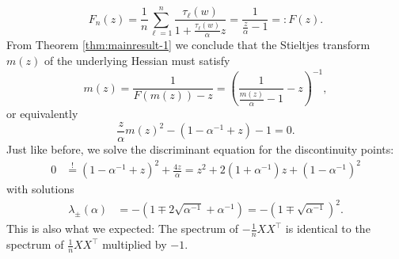 \documentclass{article}
\begin{document}
\begin{equation}
F_n(z)=\frac{1}{n}\sum_{\ell=1}^n\frac{\tau_\ell(w)}{1+\frac{\tau_\ell(w)}{\alpha}z}=\frac{1}{\frac{z}{\alpha}-1}=:F(z).
\end{equation}
From Theorem \ref{thm:mainresult-1} we conclude that the Stieltjes transform $m(z)$ of the underlying Hessian must satisfy
\begin{equation}
m(z)=\frac{1}{F(m(z))-z}=\left(\frac{1}{\frac{m(z)}{\alpha}-1}-z\right)^{-1},
\end{equation}
or equivalently
\begin{equation}
\frac{z}{\alpha}m(z)^2-(1-\alpha^{-1}+z)-1=0.
\end{equation}
Just like before, we solve the discriminant equation for the discontinuity points:
\begin{align}
0 &\stackrel{!}{=} (1-\alpha^{-1}+z)^2+\frac{4z}{\alpha} = z^2+2(1+\alpha^{-1})z+(1-\alpha^{-1})^2
\end{align}
with solutions
\begin{align}
\lambda_\pm(\alpha) &= -(1\mp2\sqrt{\alpha^{-1}}+\alpha^{-1})=-(1\mp\sqrt{\alpha^{-1}})^2. 
\end{align}
This is also what we expected: The spectrum of $-\frac{1}{n}XX^\top$ is identical to the spectrum of $\frac{1}{n}XX^\top$ multiplied by $-1$.
\end{document}
